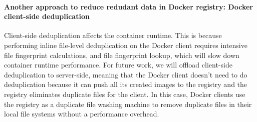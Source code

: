 
\paragraph{Another approach to reduce redudant data in Docker registry: Docker client-side deduplication}

Client-side deduplication affects the container runtime. 
This is because performing inline file-level deduplication on the Docker client %
requires intensive file fingerprint calculations, and file fingerprint lookup, 
which will slow down container runtime performance.
For future work, we will offload client-side deduplication to server-side, meaning that the 
Docker client doesn't need to do deduplication because
it can push all its created images to the registry and the registry eliminates duplicate files for the client. 
In this case, Docker clients use the registry as a duplicate file washing machine to 
remove duplicate files in their local file systems without a performance overhead.


%
%
%


